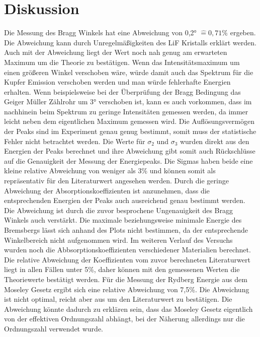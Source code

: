 \section{Diskussion}
\label{sec:Diskussion}
Die Messung des Bragg Winkels hat eine Abweichung von 0,2° $\hat{=} 0,71\%$ ergeben.
Die Abweichung kann durch Unregelmäßigkeiten des LiF Kristalls erklärt werden.
Auch mit der Abweichung liegt der Wert noch nah genug am erwarteten Maximum um die Theorie zu bestätigen.
Wenn das Intensitätsmaximum um einen größeren Winkel verschoben wäre, würde damit auch das Spektrum für die Kupfer Emission verschoben werden und man würde fehlerhafte Energien erhalten.
Wenn beispielsweise bei der Überprüfung der Bragg Bedingung das Geiger Müller Zählrohr um 3° verschoben ist, kann es auch vorkommen, dass im nachhinein beim Spektrum zu geringe Intensitäten gemessen werden, da immer leicht neben dem eigentlichen Maximum gemessen wird.
Die Auflösungsvermögen der Peaks sind im Experiment genau genug bestimmt, somit muss der statistische Fehler nicht betrachtet werden.
Die Werte für $\sigma_2$ und $\sigma_3$ wurden direkt aus den Energien der Peaks berechnet und ihre Abweichung gibt somit auch Rückschlüsse auf die Genauigkeit der Messung der Energiepeaks.
Die Sigmas haben beide eine kleine relative Abweichung von weniger als 3\% und können somit als repräsentativ für den Literaturwert angesehen werden.
Durch die geringe Abweichung der Absorptionskoeffizienten ist anzunehmen, dass die entsprechenden Energien der Peaks auch ausreichend genau bestimmt werden.
Die Abweichung ist durch die zuvor besprochene Ungenauigkeit des Bragg Winkels auch verstärkt.
Die maximale beziehungsweise minimale Energie des Bremsbergs lässt sich anhand des Plots nicht bestimmen, da der entsprechende Winkelbereich nicht aufgenommen wird.
Im weiteren Verlauf des Versuchs wurden noch die Abbsorptionskoeffizienten verschiedener Materialien berechnet.
Die relative Abweichung der Koeffizienten vom zuvor berechneten Literaturwert liegt in allen Fällen unter 5\%, daher können mit den gemessenen Werten die Theoriewerte bestätigt werden.
Für die Messung der Rydberg Energie aus dem Moseley Gesetz ergibt sich eine relative Abweichung von 7,5\%. 
Die Abweichung ist nicht optimal, reicht aber aus um den Literaturwert zu bestätigen.
Die Abweichung könnte dadurch zu erklären sein, dass das Moseley Gesetz eigentlich von der effektiven Ordnungszahl abhängt, bei der Näherung allerdings nur die Ordnungszahl verwendet wurde.


